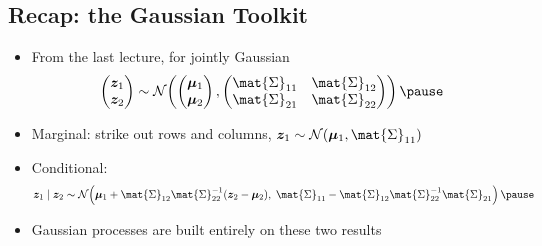 \begin{slide}
\section[-2]{Recap: the Gaussian Toolkit}

\begin{PauseHighLight}
  \begin{itemize}
  \item From the last lecture, for jointly Gaussian
    \begin{align*}
      \begin{pmatrix}\bm{z}_1\\ \bm{z}_2\end{pmatrix} \sim
      \mathcal{N}\!\left(
      \begin{pmatrix}\bm{\mu}_1\\ \bm{\mu}_2\end{pmatrix},
      \begin{pmatrix}\mat{\Sigma}_{11} & \mat{\Sigma}_{12}\\
        \mat{\Sigma}_{21} & \mat{\Sigma}_{22}\end{pmatrix}\right)\pause
    \end{align*}
  \item Marginal: strike out rows and columns,
    $\bm{z}_1\sim\mathcal{N}(\bm{\mu}_1,\mat{\Sigma}_{11})$\pause
  \item Conditional:
    \begin{align*}
      \bm{z}_1\mid\bm{z}_2 \sim \mathcal{N}\!\left(
      \bm{\mu}_1 + \mat{\Sigma}_{12}\mat{\Sigma}_{22}^{-1}(\bm{z}_2-\bm{\mu}_2),\;
      \mat{\Sigma}_{11} - \mat{\Sigma}_{12}\mat{\Sigma}_{22}^{-1}\mat{\Sigma}_{21}
      \right)\pause
    \end{align*}
  \item Gaussian processes are built entirely on these two
    results\pause
  \end{itemize}
\end{PauseHighLight}

\end{slide}



